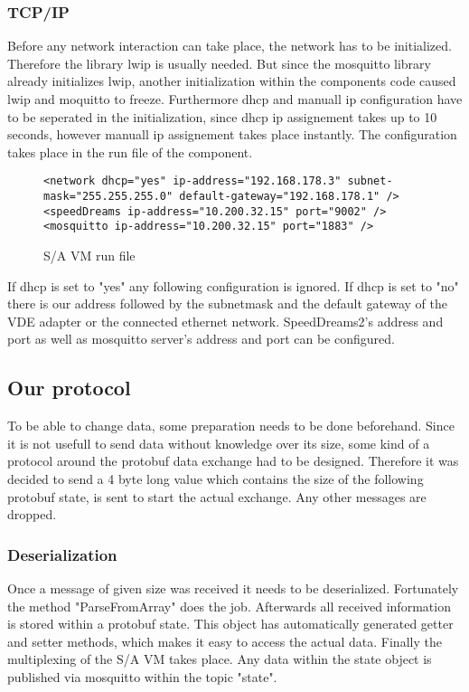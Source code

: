 \documentclass[paper=a4, fontsize=11pt]{scrartcl}
\begin{document}
  \subsubsection{TCP/IP}
Before any network interaction can take place, the network has to be initialized. Therefore the library lwip is usually needed. But since the mosquitto library already initializes lwip, another initialization within the components code caused lwip and moquitto to freeze.\newline
Furthermore dhcp and manuall ip configuration have to be seperated in the initialization, since dhcp ip assignement takes up to 10 seconds, however manuall ip assignement takes place instantly.
The configuration takes place in the run file of the component.\newline
\begin{figure}[!h]
  \centering
    \begin{verbatim}
<network dhcp="yes" ip-address="192.168.178.3" subnet-mask="255.255.255.0" default-gateway="192.168.178.1" />
<speedDreams ip-address="10.200.32.15" port="9002" />
<mosquitto ip-address="10.200.32.15" port="1883" />
    \end{verbatim}
    \caption{\tiny S/A VM run file}
  \end{figure}
If dhcp is set to "yes" any following configuration is ignored.\newline
If dhcp is set to "no" there is our address followed by the subnetmask and the default gateway of the VDE adapter or the connected ethernet network.\newline
SpeedDreams2's address and port as well as mosquitto server's address and port can be configured.
  \subsection{Our protocol} \label{ourprotocol}
To be able to change data, some preparation needs to be done beforehand. Since it is not usefull to send data without knowledge over its size, some kind of a protocol around the protobuf data exchange had to be designed. Therefore it was decided to send a 4 byte long value which contains the size of the following protobuf state, is sent to start the actual exchange. Any other messages are dropped.
  \subsubsection{Deserialization}
Once a message of given size was received it needs to be deserialized. Fortunately the method "ParseFromArray" does the job. Afterwards all received information is stored within a protobuf state. This object has automatically generated getter and setter methods, which makes it easy to access the actual data. Finally the multiplexing of the S/A VM takes place. Any data within the state object is published via mosquitto within the topic "state".
\end{document}
